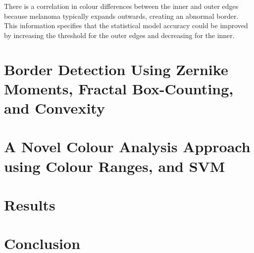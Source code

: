 There is a correlation in colour differences between the inner and outer edges because melanoma typically expands outwards, creating an abnormal border. This information specifies that the statistical model accuracy could be improved by increasing the threshold for the outer edges and decreasing for the inner.

\section{Border Detection Using Zernike Moments, 
Fractal Box-Counting, and Convexity}

\section{A Novel Colour Analysis Approach using Colour Ranges, and SVM}

\section{Results}

\section{Conclusion}





